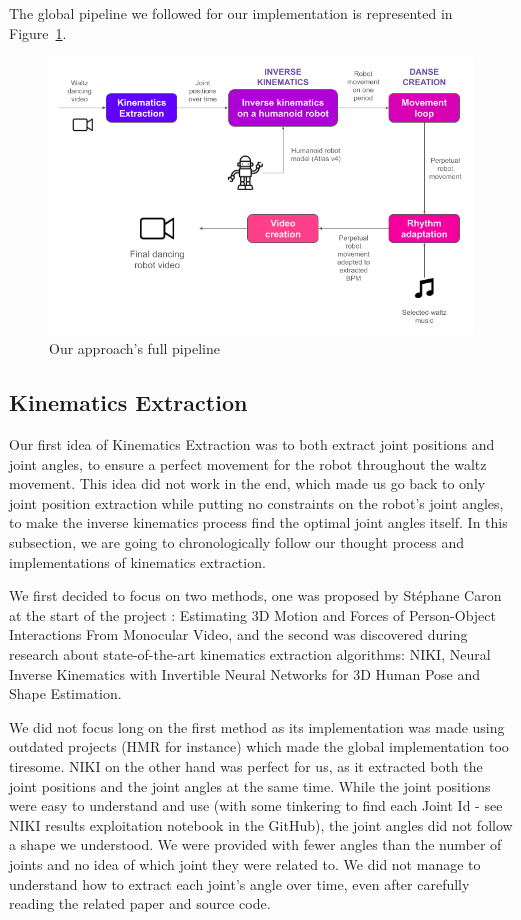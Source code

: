 \documentclass{amsart}
\theoremstyle{definition}
\theoremstyle{plain}
\begin{document}
The global pipeline we followed for our implementation is represented in Figure~\ref{fig:pipeline}.

\begin{figure}
  \includegraphics[width = 0.75 \columnwidth]{img/final_solution_pipeline.png}
  \caption{Our approach's full pipeline}\label{fig:pipeline}
\end{figure}

\subsection{Kinematics Extraction}
Our first idea of Kinematics Extraction was to both extract joint positions and joint angles, to ensure a perfect movement for the robot throughout the waltz movement. This idea did not work in the end, which made us go back to only joint position extraction while putting no constraints on the robot's joint angles, to make the inverse kinematics process find the optimal joint angles itself. In this subsection, we are going to chronologically follow our thought process and implementations of kinematics extraction.

We first decided to focus on two methods, one was proposed by Stéphane Caron at the start of the project : Estimating 3D Motion and Forces of Person-Object Interactions From Monocular Video\cite{Li_2019}, and the second was discovered during research about state-of-the-art kinematics extraction algorithms: NIKI, Neural Inverse Kinematics with Invertible Neural Networks for 3D Human Pose and Shape Estimation\cite{li2023niki}.

We did not focus long on the first method as its implementation was made using outdated projects (HMR for instance) which made the global implementation too tiresome. NIKI on the other hand was perfect for us, as it extracted both the joint positions and the joint angles at the same time. While the joint positions were easy to understand and use (with some tinkering to find each Joint Id - see NIKI results exploitation notebook in the GitHub), the joint angles did not follow a shape we understood. We were provided with fewer angles than the number of joints and no idea of which joint they were related to. We did not manage to understand how to extract each joint's angle over time, even after carefully reading the related paper and source code. 
\end{document}
